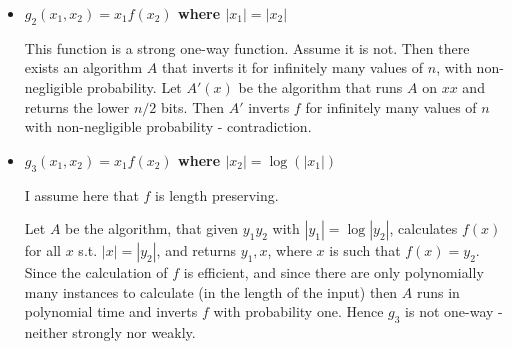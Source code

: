 \documentclass[11pt]{article} \usepackage{amssymb}
\begin{document}
\begin{enumerate}
\begin{itemize}
  \item {\bf $g_2(x_1,x_2) = x_1 f(x_2)$ where $|x_1|=|x_2|$}

    This function is a strong one-way function. Assume it is not. Then there
    exists an algorithm $A$ that inverts it for infinitely many values of $n$,
    with non-negligible probability. Let $A'(x)$ be the algorithm that runs
    $A$ on $xx$ and returns the lower $n/2$ bits. Then $A'$ inverts $f$ for
    infinitely many values of $n$ with non-negligible probability - 
    contradiction.

    \item {\bf $g_3(x_1,x_2) = x_1 f(x_2)$ where $|x_2|=\log(|x_1|)$}

      I assume here that $f$ is length preserving.

      Let $A$ be the algorithm, that given $y_1y_2$ with $|y_1|=\log|y_2|$, 
      calculates $f(x)$ for all $x$ s.t. $|x|=|y_2|$, and returns $y_1,x$, 
      where $x$ is such that $f(x)=y_2$. Since the calculation of $f$ 
      is efficient, and since there are only polynomially many instances to
      calculate (in the length of the input) then $A$ runs in polynomial
      time and inverts $f$ with probability one. Hence $g_3$ is not one-way - 
      neither strongly nor weakly.
  \end{itemize}
\end{enumerate}
\end{document}
